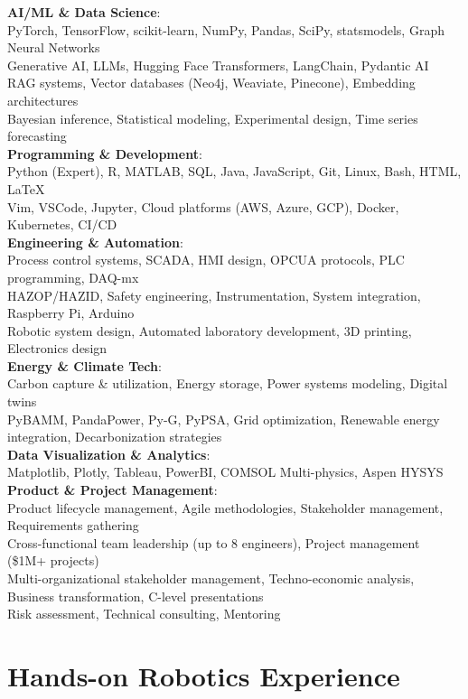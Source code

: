 \documentclass{../templates/karthicv-single}
\begin{document}
\textbf{AI/ML \& Data Science}: \\
PyTorch, TensorFlow, scikit-learn, NumPy, Pandas, SciPy, statsmodels, Graph Neural Networks \\
Generative AI, LLMs, Hugging Face Transformers, LangChain, Pydantic AI \\
RAG systems, Vector databases (Neo4j, Weaviate, Pinecone), Embedding architectures \\
Bayesian inference, Statistical modeling, Experimental design, Time series forecasting \\
\textbf{Programming \& Development}: \\
Python (Expert), R, MATLAB, SQL, Java, JavaScript, Git, Linux, Bash, HTML, \LaTeX \\
Vim, VSCode, Jupyter, Cloud platforms (AWS, Azure, GCP), Docker, Kubernetes, CI/CD \\
\textbf{Engineering \& Automation}: \\
Process control systems, SCADA, HMI design, OPCUA protocols, PLC programming, DAQ-mx \\
HAZOP/HAZID, Safety engineering, Instrumentation, System integration, Raspberry Pi, Arduino \\
Robotic system design, Automated laboratory development, 3D printing, Electronics design \\
\textbf{Energy \& Climate Tech}: \\
Carbon capture \& utilization, Energy storage, Power systems modeling, Digital twins \\
PyBAMM, PandaPower, Py-G, PyPSA, Grid optimization, Renewable energy integration, Decarbonization strategies \\
\textbf{Data Visualization \& Analytics}: \\
Matplotlib, Plotly, Tableau, PowerBI, COMSOL Multi-physics, Aspen HYSYS \\
\textbf{Product \& Project Management}: \\
Product lifecycle management, Agile methodologies, Stakeholder management, Requirements gathering \\
Cross-functional team leadership (up to 8 engineers), Project management (\$1M+ projects) \\
Multi-organizational stakeholder management, Techno-economic analysis, Business transformation, C-level presentations \\
Risk assessment, Technical consulting, Mentoring

\section{Hands-on Robotics Experience}
\end{document}
